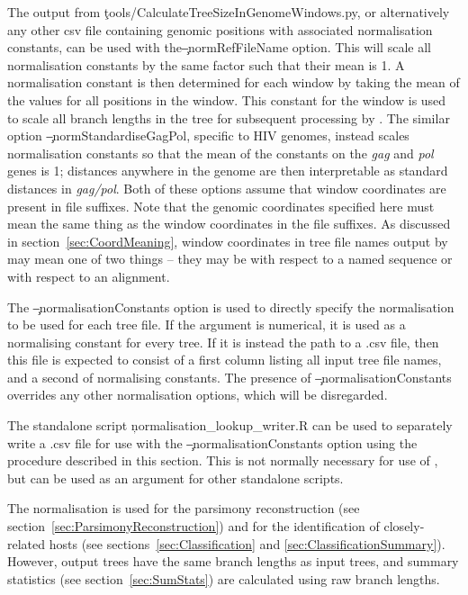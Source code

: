 The output from \c{tools/CalculateTreeSizeInGenomeWindows.py}, or alternatively any other csv file containing genomic positions with associated normalisation constants, can be used with the\break \c{--normRefFileName} option.
This will scale all normalisation constants by the same factor such that their mean is 1.
A normalisation constant is then determined for each window by taking the mean of the values for all positions in the window.
This constant for the window is used to scale all branch lengths in the tree for subsequent processing by \pat.
The similar option \c{--normStandardiseGagPol}, specific to HIV genomes, instead scales normalisation constants so that the mean of the constants on the {\it gag} and {\it pol} genes is 1; distances anywhere in the genome are then interpretable as standard distances in {\it gag/pol}.
Both of these options assume that window coordinates are present in file suffixes.
Note that the genomic coordinates specified here must mean the same thing as the window coordinates in the file suffixes.
As discussed in section~\ref{sec:CoordMeaning}, window coordinates in tree file names output by \pmt may mean one of two things -- they may be with respect to a named sequence or with respect to an alignment.

The \c{--normalisationConstants} option is used to directly specify the normalisation to be used for each tree file.
If the argument is numerical, it is used as a normalising constant for every tree.
If it is instead the path to a .csv file, then this file is expected to consist of a first column listing all input tree file names, and a second of normalising constants.
The presence of \c{--normalisationConstants} overrides any other normalisation options, which will be disregarded.

The standalone script \c{normalisation\_lookup\_writer.R} can be used to separately write a .csv file for use with the \c{--normalisationConstants} option using the procedure described in this section. This is not normally necessary for use of \pat, but can be used as an argument for other standalone scripts.

The normalisation is used for the parsimony reconstruction (see section~\ref{sec:ParsimonyReconstruction}) and for the identification of closely-related hosts (see sections~\ref{sec:Classification} and \ref{sec:ClassificationSummary}). However, output trees have the same branch lengths as input trees, and summary statistics (see section~\ref{sec:SumStats}) are calculated using raw branch lengths.

